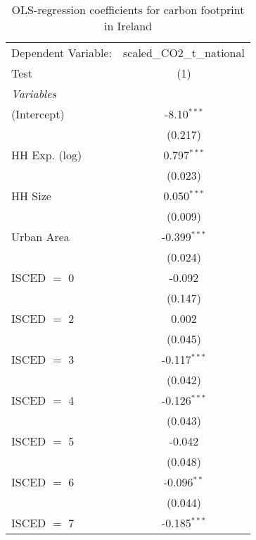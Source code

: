
\begin{table}[htbp!]
   \centering
   \small
   \begin{adjustbox}{width = 1\textwidth, max height = 0.95\textheight, center}
      \begin{threeparttable}[b]
         \caption{\label{tab:OLS_2_IRL} OLS-regression coefficients for carbon footprint in Ireland}
         \begin{tabular}{lc}
            \tabularnewline \midrule \midrule
            Dependent Variable: & scaled\_CO2\_t\_national\\     
            Test                & (1)\\  
            \midrule
            \emph{Variables}\\
            (Intercept)         & -8.10$^{***}$\\   
                                & (0.217)\\   
            HH Exp. (log)       & 0.797$^{***}$\\   
                                & (0.023)\\   
            HH Size             & 0.050$^{***}$\\   
                                & (0.009)\\   
            Urban Area          & -0.399$^{***}$\\   
                                & (0.024)\\   
            ISCED $=$ 0         & -0.092\\   
                                & (0.147)\\   
            ISCED $=$ 2         & 0.002\\   
                                & (0.045)\\   
            ISCED $=$ 3         & -0.117$^{***}$\\   
                                & (0.042)\\   
            ISCED $=$ 4         & -0.126$^{***}$\\   
                                & (0.043)\\   
            ISCED $=$ 5         & -0.042\\   
                                & (0.048)\\   
            ISCED $=$ 6         & -0.096$^{**}$\\   
                                & (0.044)\\   
            ISCED $=$ 7         & -0.185$^{***}$\\   

\end{tabular}
\end{threeparttable}
\end{adjustbox}
\end{table}
